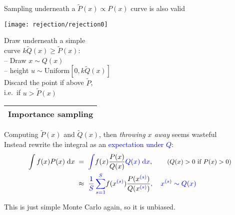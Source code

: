 \documentclass[25pt,landscape]{foils}
\newcommand{\Blue}{\textcolor{blue}}
\newcommand{\Gray}{\textcolor{mygray}}
\newcommand{\myfoilhead}[1]{
\newpage
\vspace*{-1cm}
\Gray{
\begin{tabular*}{\textwidth}{l}
{\bf \Huge #1} \\
\bottomrule
\end{tabular*}}}
\begin{document}
Sampling underneath a $\tilde{P}(x)\!\propto\! P(x)$ curve is also valid

\vspace*{2cm}

\hspace*{-1cm}\texttt{[image: rejection/rejection0]}

\vspace*{-13cm}

\hspace*{0.5\linewidth}\begin{minipage}{0.55\linewidth}
    Draw underneath a simple\\curve $k \tilde{Q}(x)\ge \tilde{P}(x)$:\\[0.1in]
\hspace*{2cm} -- Draw $x\sim Q(x)$\\
\hspace*{2cm} -- height $u\sim\mbox{Uniform}[0,k\tilde{Q}(x)]$\\

Discard the point if above $\tilde{P}$,\\i.e.\ if $u>\tilde{P}(x)$

\vfill
\end{minipage}

\myfoilhead{Importance sampling}

\vfill

Computing $\tilde{P}(x)$ and $\tilde{Q}(x)$, then \emph{throwing $x$ away} seems wasteful\\
Instead rewrite the integral as an \Blue{expectation under $Q$}:
\[
\begin{split}
    \int f(x)P(x) \;\mathrm{d}x &\;=\; \Blue{\int} f(x)\frac{P(x)}{Q(x)} \Blue{Q(x) \;\mathrm{d}x}, \qquad \mbox{\small $(Q(x)>0\mbox{ if }P(x)>0)$}\\
    &\;\approx\; \Blue{\frac{1}{S} \sum_{s=1}^S} f(x^{\Blue{(s)}})\frac{P(x^{\Blue{(s)}})}{Q(x^{\Blue{(s)}})}\Blue{, \quad x^{(s)}\sim Q(x)}
\end{split}
\]

\vfill

This is just simple Monte Carlo again, so it is unbiased.

\end{document}
